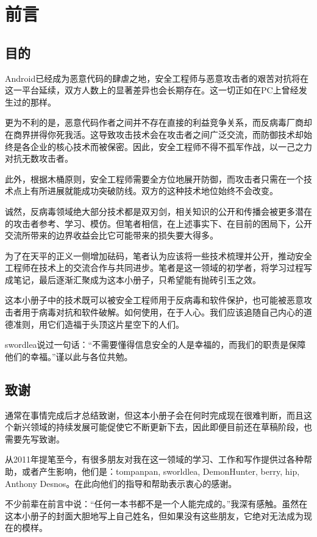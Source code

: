 \chapter{前言}
\section*{目的}
Android已经成为恶意代码的肆虐之地，安全工程师与恶意攻击者的艰苦对抗将在这一平台延续，双方人数上的显著差异也会长期存在。这一切正如在PC上曾经发生过的那样。

更为不利的是，恶意代码作者之间并不存在直接的利益竞争关系，而反病毒厂商却在商界拼得你死我活。这导致攻击技术会在攻击者之间广泛交流，而防御技术却始终是各企业的核心技术而被保密。因此，安全工程师不得不孤军作战，以一己之力对抗无数攻击者。

此外，根据木桶原则，安全工程师需要全方位地展开防御，而攻击者只需在一个技术点上有所进展就能成功突破防线。双方的这种技术地位始终不会改变。

诚然，反病毒领域绝大部分技术都是双刃剑，相关知识的公开和传播会被更多潜在的攻击者参考、学习、模仿。但笔者相信，在上述事实下、在目前的困局下，公开交流所带来的边界收益会比它可能带来的损失要大得多。

为了在天平的正义一侧增加砝码，笔者认为应该将一些技术梳理并公开，推动安全工程师在技术上的交流合作与共同进步。笔者是这一领域的初学者，将学习过程写成笔记，最后逐渐汇聚成为这本小册子，只希望能有抛砖引玉之效。

这本小册子中的技术既可以被安全工程师用于反病毒和软件保护，也可能被恶意攻击者用于病毒对抗和软件破解。如何使用，在于人心。我们应该追随自己内心的道德准则，用它们造福于头顶这片星空下的人们。

swordlea说过一句话：“不需要懂得信息安全的人是幸福的，而我们的职责是保障他们的幸福。”谨以此与各位共勉。

\section*{致谢}
通常在事情完成后才总结致谢，但这本小册子会在何时完成现在很难判断，而且这个新兴领域的持续发展可能促使它不断更新下去，因此即便目前还在草稿阶段，也需要先写致谢。

从2011年提笔至今，有很多朋友对我在这一领域的学习、工作和写作提供过各种帮助，或者产生影响，他们是：tompanpan, sworldlea, DemonHunter, berry, hip, Anthony Desnos。在此向他们的指导和帮助表示衷心的感谢。

不少前辈在前言中说：“任何一本书都不是一个人能完成的。”我深有感触。虽然在这本小册子的封面大胆地写上自己姓名，但如果没有这些朋友，它绝对无法成为现在的模样。

